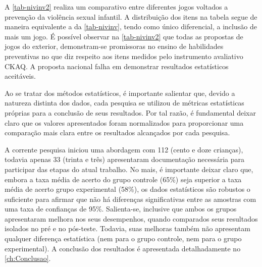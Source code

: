 A \autoref{tab-nivinv2} realiza um comparativo entre diferentes jogos voltados a prevenção da violência sexual infantil. A distribuição dos itens na tabela segue de maneira equivalente a da \autoref{tab-nivinv}, tendo como único diferencial, a inclusão de mais um jogo. É possível observar na \autoref{tab-nivinv2} que todas as propostas de jogos do exterior, demonstram-se promissoras no ensino de habilidades preventivas no que diz respeito aos itens medidos pelo instrumento avaliativo \ac{CKAQ}. A proposta nacional falha em demonstrar resultados estatísticos aceitáveis. 

Ao se tratar dos métodos estatísticos, é importante salientar que, devido a natureza distinta dos dados, cada pesquisa se utilizou de métricas estatísticas próprias para a conclusão de seus resultados. Por tal razão, é fundamental deixar claro que os valores apresentados foram normalizados para proporcionar uma comparação mais clara entre os resultados alcançados por cada pesquisa. 

A corrente pesquisa iniciou uma abordagem com 112 (cento e doze crianças), todavia apenas 33 (trinta e três) apresentaram documentação necessária para participar das etapas do atual trabalho. No mais, é importante deixar claro que, embora a taxa média de acerto do grupo controle (65\%) seja superior a taxa média de acerto grupo experimental (58\%), os dados estatísticos são robustos o suficiente para afirmar que não há diferenças significativas entre as amostras com uma taxa de confianças de 95\%. Salienta-se, inclusive que ambos os grupos apresentaram melhora nos seus desempenhos, quando comparados seus resultados isolados no pré e no pós-teste. Todavia, suas melhoras também não apresentam qualquer diferença estatística (nem para o grupo controle, nem para o grupo experimental). A conclusão dos resultados é apresentada detalhadamente no \autoref{ch:Conclusao}.
